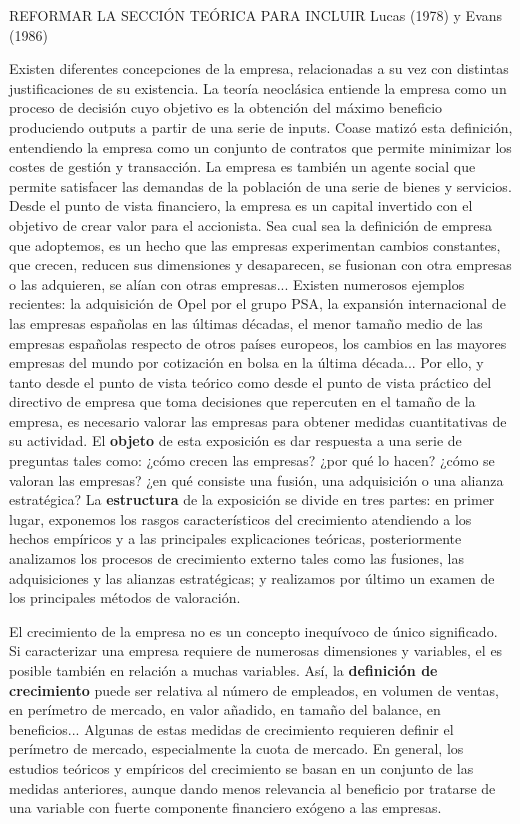 \documentclass{nuevotema}
\begin{document}
\ideaclave

REFORMAR LA SECCIÓN TEÓRICA PARA INCLUIR Lucas (1978) y Evans (1986)

Existen diferentes concepciones de la empresa, relacionadas a su vez con distintas justificaciones de su existencia. La teoría neoclásica entiende la empresa como un proceso de decisión cuyo objetivo es la obtención del máximo beneficio produciendo outputs a partir de una serie de inputs. Coase matizó esta definición, entendiendo la empresa como un conjunto de contratos que permite minimizar los costes de gestión y transacción. La empresa es también un agente social que permite satisfacer las demandas de la población de una serie de bienes y servicios. Desde el punto de vista financiero, la empresa es un capital invertido con el objetivo de crear valor para el accionista. Sea cual sea la definición de empresa que adoptemos, es un hecho que las empresas experimentan cambios constantes, que crecen, reducen sus dimensiones y desaparecen, se fusionan con otra empresas o las adquieren, se alían con otras empresas... Existen numerosos ejemplos recientes: la adquisición de Opel por el grupo PSA, la expansión internacional de las empresas españolas en las últimas décadas, el menor tamaño medio de las empresas españolas respecto de otros países europeos, los cambios en las mayores empresas del mundo por cotización en bolsa en la última década... Por ello, y tanto desde el punto de vista teórico como desde el punto de vista práctico del directivo de empresa que toma decisiones que repercuten en el tamaño de la empresa, es necesario valorar las empresas para obtener medidas cuantitativas de su actividad. El \textbf{objeto} de esta exposición es dar respuesta a una serie de preguntas tales como: ¿cómo crecen las empresas? ¿por qué lo hacen? ¿cómo se valoran las empresas? ¿en qué consiste una fusión, una adquisición o una alianza estratégica? La \textbf{estructura} de la exposición se divide en tres partes: en primer lugar, exponemos los rasgos característicos del crecimiento atendiendo a los hechos empíricos y a las principales explicaciones teóricas, posteriormente analizamos los procesos de crecimiento externo tales como las fusiones, las adquisiciones y las alianzas estratégicas; y realizamos por último un examen de los principales métodos de valoración.

El crecimiento de la empresa no es un concepto inequívoco de único significado. Si caracterizar una empresa requiere de numerosas dimensiones y variables, el  es posible también en relación a muchas variables. Así, la \textbf{definición de crecimiento} puede ser relativa al número de empleados, en volumen de ventas, en perímetro de mercado, en valor añadido, en tamaño del balance, en beneficios... Algunas de estas medidas de crecimiento requieren definir el perímetro de mercado, especialmente la cuota de mercado. En general, los estudios teóricos y empíricos del crecimiento se basan en un conjunto de las medidas anteriores, aunque dando menos relevancia al beneficio por tratarse de una variable con fuerte componente financiero exógeno a las empresas. 
\end{document}
